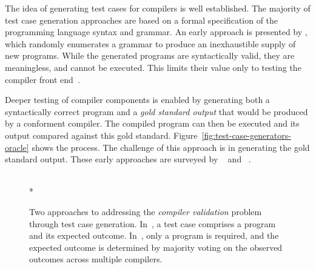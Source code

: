 The idea of generating test cases for compilers is well established. The majority of test case generation approaches are based on a formal specification of the programming language syntax and grammar.
An early approach is presented by \citeauthor{Hanford1970a}, which randomly enumerates a grammar to produce an inexhaustible supply of new programs. While the generated programs are syntactically valid, they are meaningless, and cannot be executed. This limits their value only to testing the compiler front end~\cite{Hanford1970a}.

Deeper testing of compiler components is enabled by generating both a syntactically correct program and a \emph{gold standard output} that would be produced by a conforment compiler. The compiled program can then be executed and its output compared against this gold standard. Figure~\ref{fig:test-case-generators-oracle} shows the process. The challenge of this approach is in generating the gold standard output. These early approaches are surveyed by \citeauthor{Boujarwah1997}~\cite{Boujarwah1997} and \citeauthor{Kossatchev2005}~\cite{Kossatchev2005}.

\begin{figure}
  \centering
  \\*
  \caption[Generating and evaluating compiler test cases]{%
    Two approaches to addressing the \emph{compiler validation} problem through test case generation. In~\protect{}, a test case comprises a program and its expected outcome. In~\protect{}, only a program is required, and the expected outcome is determined by majority voting on the observed outcomes across multiple compilers.%
  }%
  \label{fig:test-case-generators}
\end{figure}

